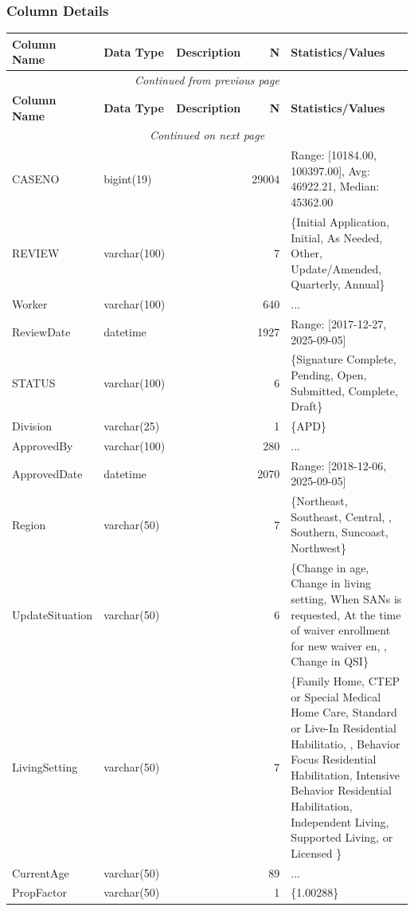 \begin{landscape}
\subsubsection{Column Details}
\begin{longtable}{|l|l|l|r|p{6cm}|}
\hline
\textbf{Column Name} & \textbf{Data Type} & \textbf{Description} & \textbf{N} & \textbf{Statistics/Values} \\
\hline
\endfirsthead
\multicolumn{5}{c}{\textit{Continued from previous page}} \\
\hline
\textbf{Column Name} & \textbf{Data Type} & \textbf{Description} & \textbf{N} & \textbf{Statistics/Values} \\
\hline
\endhead
\hline
\multicolumn{5}{c}{\textit{Continued on next page}} \\
\endfoot
\hline
\endlastfoot
CASENO & bigint(19) &  & 29004 & Range: [10184.00, 100397.00], Avg: 46922.21, Median: 45362.00 \\
\hline
REVIEW & varchar(100) &  & 7 & \{Initial Application, Initial, As Needed, Other, Update/Amended, Quarterly, Annual\} \\
\hline
Worker & varchar(100) &  & 640 & ... \\
\hline
ReviewDate & datetime &  & 1927 & Range: [2017-12-27, 2025-09-05] \\
\hline
STATUS & varchar(100) &  & 6 & \{Signature Complete, Pending, Open, Submitted, Complete, Draft\} \\
\hline
Division & varchar(25) &  & 1 & \{APD\} \\
\hline
ApprovedBy & varchar(100) &  & 280 & ... \\
\hline
ApprovedDate & datetime &  & 2070 & Range: [2018-12-06, 2025-09-05] \\
\hline
Region & varchar(50) &  & 7 & \{Northeast, Southeast, Central, , Southern, Suncoast, Northwest\} \\
\hline
UpdateSituation & varchar(50) &  & 6 & \{Change in age, Change in living setting, When SANs is requested, At the time of waiver enrollment for new waiver en, , Change in QSI\} \\
\hline
LivingSetting & varchar(50) &  & 7 & \{Family Home, CTEP or Special Medical Home Care, Standard or Live-In Residential Habilitatio, , Behavior Focus Residential Habilitation, Intensive Behavior Residential Habilitation, Independent Living, Supported Living, or Licensed \} \\
\hline
CurrentAge & varchar(50) &  & 89 & ... \\
\hline
PropFactor & varchar(50) &  & 1 & \{1.00288\} \\

\end{longtable}
\end{landscape}
